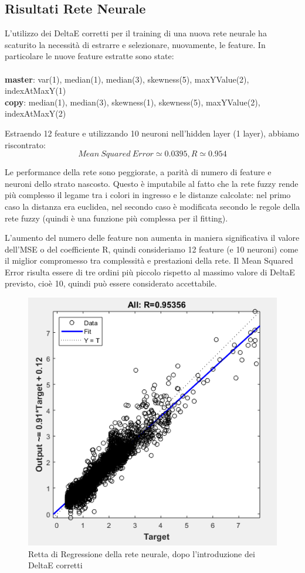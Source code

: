 \subsection{Risultati Rete Neurale}
L'utilizzo dei DeltaE corretti per il training di una nuova rete neurale ha scaturito la necessità di estrarre e selezionare, nuovamente, le feature. In particolare le nuove feature estratte sono state:
\\\\
\textbf{master}: var(1), median(1), median(3), skewness(5), maxYValue(2), indexAtMaxY(1)
\\
\textbf{copy}: median(1), median(3), skewness(1), skewness(5), maxYValue(2), indexAtMaxY(2)

Estraendo 12 feature e utilizzando 10 neuroni nell'hidden layer (1 layer), abbiamo riscontrato:
\[Mean\ Squared\ Error \simeq 0.0395, R \simeq 0.954\]

Le performance della rete sono peggiorate, a parità di numero di feature e neuroni dello strato nascosto. Questo è imputabile al fatto che la rete fuzzy rende più complesso il legame tra i colori in ingresso e le distanze calcolate: nel primo caso la distanza era euclidea, nel secondo caso è modificata secondo le regole della rete fuzzy (quindi è una funzione più complessa per il fitting).

L'aumento del numero delle feature non aumenta in maniera significativa il valore dell'MSE o del coefficiente R, quindi consideriamo 12 feature (e 10 neuroni) come il miglior compromesso tra complessità e prestazioni della rete. Il Mean Squared Error risulta essere di tre ordini più piccolo rispetto al massimo valore di DeltaE previsto, cioè 10, quindi può essere considerato accettabile.

\begin{figure}[!ht]
\begin{center}
	\includegraphics[scale=1]{images/rete2-regression.PNG}
\end{center}
\caption{Retta di Regressione della rete neurale, dopo l'introduzione dei DeltaE corretti}
\end{figure}
